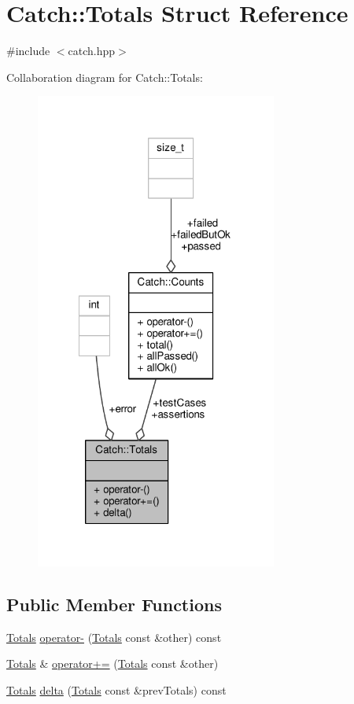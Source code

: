 \hypertarget{struct_catch_1_1_totals}{\section{Catch\-:\-:Totals Struct Reference}
\label{struct_catch_1_1_totals}
}


{\ttfamily \#include $<$catch.\-hpp$>$}



Collaboration diagram for Catch\-:\-:Totals\-:
\nopagebreak
\begin{figure}[H]
\begin{center}
\leavevmode
\includegraphics[width=225pt]{struct_catch_1_1_totals__coll__graph}
\end{center}
\end{figure}
\subsection*{Public Member Functions}
\begin{DoxyCompactItemize}
\item 
\hyperlink{struct_catch_1_1_totals}{Totals} \hyperlink{struct_catch_1_1_totals_abe15cd8a82ba9a4868dd7a542add827c}{operator-\/} (\hyperlink{struct_catch_1_1_totals}{Totals} const \&other) const 
\item 
\hyperlink{struct_catch_1_1_totals}{Totals} \& \hyperlink{struct_catch_1_1_totals_a574015076e54cc405c70b053e3356e43}{operator+=} (\hyperlink{struct_catch_1_1_totals}{Totals} const \&other)
\item 
\hyperlink{struct_catch_1_1_totals}{Totals} \hyperlink{struct_catch_1_1_totals_a3dee0f599c081a8360c0112fb1dafe8f}{delta} (\hyperlink{struct_catch_1_1_totals}{Totals} const \&prev\-Totals) const 
\end{DoxyCompactItemize}
